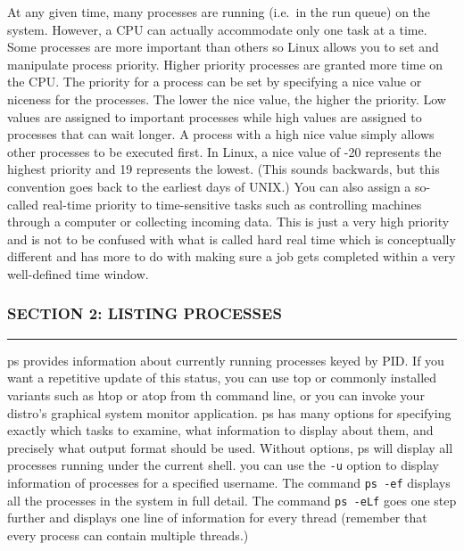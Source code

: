 At any given time, many processes are running (i.e.~in the run queue) on
the system. However, a CPU can actually accommodate only one task at a
time. Some processes are more important than others so Linux allows you
to set and manipulate process priority. Higher priority processes are
granted more time on the CPU. The priority for a process can be set by
specifying a nice value or niceness for the processes. The lower the
nice value, the higher the priority. Low values are assigned to
important processes while high values are assigned to processes that can
wait longer. A process with a high nice value simply allows other
processes to be executed first. In Linux, a nice value of -20 represents
the highest priority and 19 represents the lowest. (This sounds
backwards, but this convention goes back to the earliest days of UNIX.)
You can also assign a so-called real-time priority to time-sensitive
tasks such as controlling machines through a computer or collecting
incoming data. This is just a very high priority and is not to be
confused with what is called hard real time which is conceptually
different and has more to do with making sure a job gets completed
within a very well-defined time window.

\subsubsection{SECTION 2: LISTING
PROCESSES}\label{section-2-listing-processes}

\begin{center}\rule{3in}{0.4pt}\end{center}

ps provides information about currently running processes keyed by PID.
If you want a repetitive update of this status, you can use top or
commonly installed variants such as htop or atop from th command line,
or you can invoke your distro's graphical system monitor application. ps
has many options for specifying exactly which tasks to examine, what
information to display about them, and precisely what output format
should be used. Without options, ps will display all processes running
under the current shell. you can use the \texttt{-u} option to display
information of processes for a specified username. The command
\texttt{ps -ef} displays all the processes in the system in full detail.
The command \texttt{ps -eLf} goes one step further and displays one line
of information for every thread (remember that every process can contain
multiple threads.)

